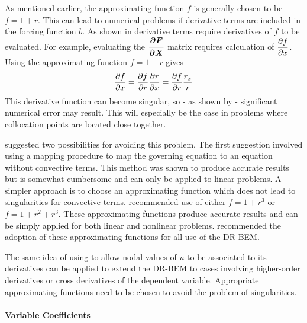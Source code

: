 As mentioned earlier, the approximating function $f$ is generally chosen to be
$f = 1 + r$.  This can lead to numerical problems if derivative terms are
included in the forcing function $b$.  As shown in 
derivative terms require derivatives of $f$ to be evaluated.  For example,
evaluating the $\matr{\delby{F}{x}}$ matrix requires calculation of
$ \dfrac{\partial f}{\partial x} $.  Using the approximating function $f = 1 + r$ gives
\begin{equation}
   \dfrac{\partial f}{\partial x}  =  \dfrac{\partial f}{\partial r}   \dfrac{\partial r}{\partial x}  =  \dfrac{\partial f}{\partial r}  \dfrac{r_{x}}{r} 
\end{equation}
This derivative function can become singular, so - as shown by
 - significant numerical error may result.  This
will especially be the case in problems where collocation points are located
close together.

 suggested two possibilities for avoiding this
problem.  The first suggestion involved using a mapping procedure to map
the governing equation to an equation without convective terms. This method
was shown to produce accurate results but is somewhat cumbersome and can
only be applied to linear problems.  A simpler approach is to choose an
approximating function which does not lead to singularities for convective
terms.   recommended use of either $f = 1 + r^{3}$
or $f = 1 + r^{2}+ r^{3}$.  These approximating functions produce accurate
results and can be simply applied for both linear and nonlinear problems.
 recommended the adoption of these approximating
functions for all use of the DR-BEM.

The same idea of using  to allow nodal values of $u$ to be
associated to its derivatives can be applied to extend the DR-BEM to cases
involving higher-order derivatives or cross derivatives of the dependent
variable.  Appropriate approximating functions need to be chosen to avoid
the problem of singularities.

\paragraph{Variable Coefficients}

